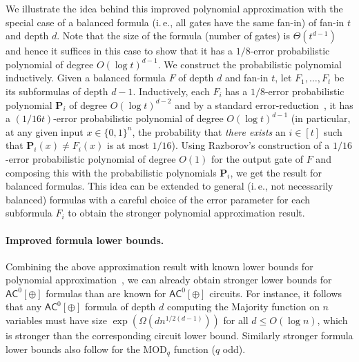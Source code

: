 \documentclass[11pt]{article}
\numberwithin{equation}{section}
\theoremstyle{definition}
\theoremstyle{plain}
\newcommand{\cclass}[1]{\textsf{#1}}
\newcommand{\ie}{i.\,e.}
\newcommand{\mb}{\mathbf}
\newcommand{\AC}{\cclass{AC}}
\begin{document}
We illustrate the idea behind this improved polynomial approximation with the special case of a balanced formula (\ie, all gates have the same fan-in) of fan-in $t$ and depth $d$. Note that the size of the formula (number of gates) is $\Theta(t^{d-1})$ and hence it suffices in this case to show that it has a $1/8$-error probabilistic polynomial of degree $O(\log t)^{d-1}$. We construct the probabilistic polynomial inductively. Given a balanced formula $F$ of depth $d$ and fan-in $t$, let $F_1,\ldots,F_t$ be its subformulas of depth $d-1$. Inductively, each $F_i$ has a $1/8$-error probabilistic polynomial ${\mb P}_i$ of degree $O(\log t)^{d-2}$ and by a standard error-reduction~\cite{kopparty2012certifying}, it has a $(1/16t)$-error probabilistic polynomial of degree $O(\log t)^{d-1}$ (in particular, at any given input $x\in \{0,1\}^n$, the probability that \emph{there exists} an $i\in [t]$ such that ${\mb P}_i(x)\neq F_i(x)$ is at most $1/16$). Using Razborov's construction of a $1/16$-error probabilistic polynomial of degree $O(1)$ for the output gate of $F$ and composing this with the probabilistic polynomials ${\mb P}_i$, we get the result for balanced formulas. This idea can be extended to general (\ie, not necessarily balanced) formulas with a careful choice of the error parameter for each subformula $F_i$ to obtain the stronger polynomial approximation result. 

\paragraph{Improved formula lower bounds.} Combining the above approximation result with known lower bounds for polynomial 
approximation~\cite{Razborov,Smolensky87,Szegedy1989, %
Smolensky93}, we can already obtain stronger lower bounds for $\AC^0[\oplus]$ formulas than are known for $\AC^0[\oplus]$ circuits. For instance, it follows that any $\AC^0[\oplus]$ formula of depth $d$ computing the Majority function on $n$ variables must have size $\exp(\Omega(dn^{1/2(d-1)}))$ for all $d \le O(\log n)$, which is stronger than the corresponding circuit lower bound. Similarly stronger formula lower bounds also follow for the $\mathrm{MOD}_q$ function ($q$ odd). 
\end{document}
